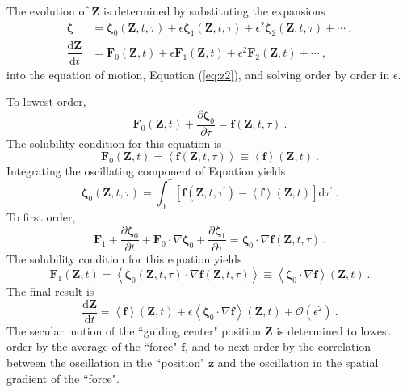 \documentclass[12pt,a4paper]{article}
\renewcommand{\vec}[1]{\boldsymbol{#1}}
\newcommand{\dif}{\mathrm{d}}
\begin{document}
The evolution of $\vec{Z}$ is determined by substituting the expansions
\begin{align}
\vec{\zeta} &=  \vec{\zeta}_0(\vec{Z}, t, \tau)  +\epsilon \vec{\zeta}_1(\vec{Z}, t, \tau)  +\epsilon^2 \vec{\zeta}_2(\vec{Z}, t, \tau) + \cdots ~, \\
\dfrac{\dif \vec{Z}}{\dif t} &= \vec{F}_0(\vec{Z}, t)  +\epsilon \vec{F}_1(\vec{Z}, t)  +\epsilon^2 \vec{F}_2(\vec{Z}, t) + \cdots ~, 
\end{align}
into the equation of motion, Equation (\ref{eq:z2}), and solving order by order in $\epsilon$.

To lowest order,
\begin{equation}
\vec{F}_0(\vec{Z}, t) + \dfrac{\partial \vec{\zeta}_0 }{\partial \tau} = \vec{f}(\vec{Z}, t, \tau) ~.
\end{equation}
The solubility condition for this equation is
\begin{equation}
\vec{F}_0(\vec{Z}, t) = \left\langle \vec{f}(\vec{Z}, t, \tau) \right\rangle \equiv \left\langle \vec{f}  \right\rangle(\vec{Z}, t) ~.
\end{equation}
Integrating the oscillating component of Equation yields
\begin{equation}
\vec{\zeta}_0(\vec{Z}, t, \tau) = \int_0^\tau [\vec{f}(\vec{Z}, t, \tau^\prime) - \left\langle \vec{f}  \right\rangle(\vec{Z}, t)] \dif \tau^\prime ~.
\end{equation}
To first order,
\begin{equation}
\vec{F}_1 +\dfrac{\partial \vec{\zeta}_0 }{\partial t}  +\vec{F}_0 \cdot \nabla \vec{\zeta}_0 + \dfrac{\partial \vec{\zeta}_1 }{\partial \tau} =  \vec{\zeta}_0 \cdot \nabla \vec{f}(\vec{Z}, t, \tau) ~.
\end{equation}
The solubility condition for this equation yields
\begin{equation}
\vec{F}_1(\vec{Z}, t) = \left\langle \vec{\zeta}_0 (\vec{Z}, t, \tau) \cdot \nabla\vec{f}(\vec{Z}, t, \tau)  \right\rangle \equiv \left\langle \vec{\zeta}_0 \cdot \nabla\vec{f} \right\rangle (\vec{Z}, t) ~.
\end{equation}
The final result is
\begin{equation}
\dfrac{\dif \vec{Z}}{\dif t}  = \left\langle \vec{f}  \right\rangle(\vec{Z}, t) + \epsilon \left\langle \vec{\zeta}_0 \cdot \nabla\vec{f} \right\rangle (\vec{Z}, t) + \mathcal O (\epsilon^2) ~.
\end{equation}
The secular motion of the ``guiding center" position $\vec{Z}$ is determined to lowest order by the average of the ``force" $\vec{f}$, and to next order by the correlation between the oscillation in the ``position" $\vec{z}$ and the oscillation in the spatial gradient of the ``force".
\end{document}
